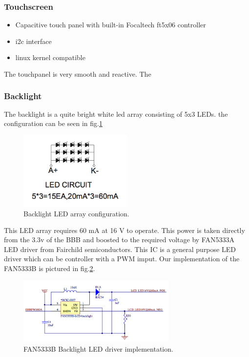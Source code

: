\subsubsection{Touchscreen}

\begin{itemize}
  \item {Capacitive touch panel with built-in Focaltech ft5x06 controller}
  \item {i2c interface}
  \item {linux kernel compatible}
\end{itemize}
The touchpanel is very smooth and reactive. The
\subsubsection{Backlight}
\label{chap: backlight}
The backlight is a quite bright white led array consisting of 5x3 LEDs. the configuration can be seen in fig.\ref{fig:backlight_led}

\begin{figure}[!htb]
    \centering
    \includegraphics[width=0.5\textwidth,keepaspectratio]{chap/hardFig/backlight_led_circuit}
    \caption{Backlight LED array configuration.}
    \label{fig:backlight_led}
\end{figure}

This LED array requires 60 mA at 16 V to operate. This power is taken directly from the 3.3v of the BBB and boosted to the required voltage by FAN5333A LED driver from Fairchild semiconductors.
This IC is a general purpose LED driver which can be controller with a PWM imput.
Our implementation of the FAN5333B is pictured in fig.\ref{fig:backlight driver schematics}.

\begin{figure}[!htb]
    \centering
    \includegraphics[width=0.7\textwidth,keepaspectratio]{chap/hardFig/backlight_led_driver_sch}
    \caption{FAN5333B Backlight LED driver implementation.}
    \label{fig:backlight driver schematics}
\end{figure}

